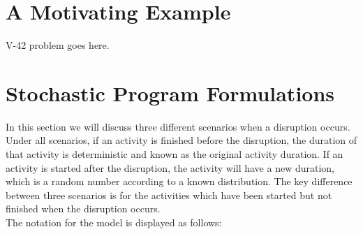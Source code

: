 \documentclass[11pt]{article}
\begin{document}
\section{A Motivating Example}
	V-42 problem goes here.
\section{Stochastic Program Formulations}
	In this section we will discuss three different scenarios when a disruption occurs. Under all scenarios, if an activity is finished before the disruption, the duration of that activity is deterministic and known as the original activity duration. If an activity is started after the disruption, the activity will have a new duration, which is a random number according to a known distribution. The key difference between three scenarios is for the activities which have been started but not finished when the disruption occurs. \\
	\newline The notation for the model is displayed as follows:
\end{document}

